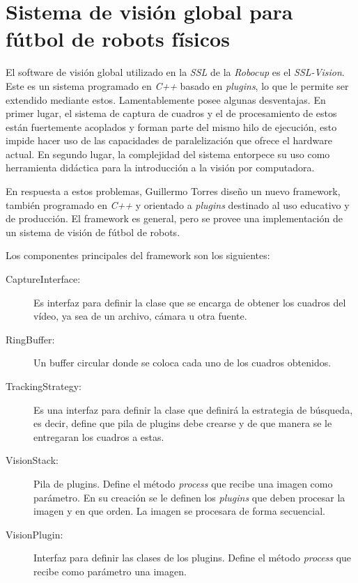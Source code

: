 
\section{Sistema de visión global para fútbol de robots físicos}

El software de visión global utilizado en la \emph{SSL} de la \emph{Robocup} es
el \emph{SSL-Vision}. Este es un sistema programado en \emph{C++} basado en
\emph{plugins}, lo que le permite ser extendido mediante estos. Lamentablemente
posee algunas desventajas. En primer lugar, el sistema de captura de cuadros y
el de procesamiento de estos están fuertemente acoplados y forman parte del
mismo hilo de ejecución, esto impide hacer uso de las capacidades de
paralelización que ofrece el hardware actual. En segundo lugar, la complejidad
del sistema entorpece su uso como herramienta didáctica para la introducción a
la visión por computadora.

En respuesta a estos problemas, Guillermo Torres\cite{torres2014} diseño un
nuevo framework, también programado en \emph{C++} y orientado a \emph{plugins}
destinado al uso educativo y de producción. El framework es general, pero se
provee una implementación de un sistema de visión de fútbol de robots.

Los componentes principales del framework son los siguientes:

\begin{description}

	\item[CaptureInterface:] Es interfaz para definir la clase que se
		encarga de obtener los cuadros del vídeo, ya sea de un archivo,
		cámara u otra fuente.

	\item[RingBuffer:] Un buffer circular donde se coloca cada uno de los
		cuadros obtenidos.

	\item[TrackingStrategy:] Es una interfaz para definir la clase que
		definirá la estrategia de búsqueda, es decir, define que pila de
		plugins debe crearse y de que manera se le entregaran los
		cuadros a estas.

	
	\item[VisionStack:] Pila de plugins. Define el método \emph{process} que
		recibe una imagen como parámetro. En su creación se le definen
		los \emph{plugins} que deben procesar la imagen y en que orden.
		La imagen se procesara de forma secuencial.

	\item[VisionPlugin:] Interfaz para definir las clases de los plugins.
		Define el método \emph{process} que recibe como parámetro una
		imagen.

\end{description}

